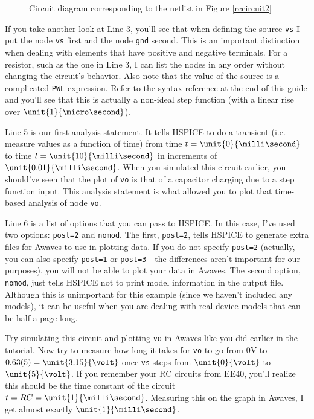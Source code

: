\documentclass{article}
\begin{document}
\begin{figure}[!htb]
  
  \centerline{\box\graph}
  \caption{Circuit diagram corresponding to the netlist in Figure \ref{rccircuit2}}
  \label{rccircuitdiagram}
\end{figure}

If you take another look at Line 3, you'll see that when defining the source \verb|vs| I put the node \verb|vs| first and the node \verb|gnd| second. This is an important distinction when dealing with elements that have positive and negative terminals. For a resistor, such as the one in Line 3, I can list the nodes in any order without changing the circuit's behavior. Also note that the value of the source is a complicated \verb|PWL| expression. Refer to the syntax reference at the end of this guide and you'll see that this is actually a non-ideal step function (with a linear rise over $\unit{1}{\micro\second}$).

Line 5 is our first analysis statement. It tells HSPICE to do a transient (i.e. measure values as a function of time) from time $t=\unit{0}{\milli\second}$ to time $t=\unit{10}{\milli\second}$ in increments of $\unit{0.01}{\milli\second}$. When you simulated this circuit earlier, you should've seen that the plot of \verb|vo| is that of a capacitor charging due to a step function input. This analysis statement is what allowed you to plot that time-based analysis of node \verb|vo|.

Line 6 is a list of options that you can pass to HSPICE. In this case, I've used two options: \verb|post=2| and \verb|nomod|. The first, \verb|post=2|, tells HSPICE to generate extra files for Awaves to use in plotting data. If you do not specify \verb|post=2| (actually, you can also specify \verb|post=1| or \verb|post=3|---the differences aren't important for our purposes), you will not be able to plot your data in Awaves. The second option, \verb|nomod|, just tells HSPICE not to print model information in the output file. Although this is unimportant for this example (since we haven't included any models), it can be useful when you are dealing with real device models that can be half a page long.

Try simulating this circuit and plotting \verb|vo| in Awaves like you did earlier in the tutorial. Now try to measure how long it takes for \verb|vo| to go from 0V to $0.63(5) = \unit{3.15}{\volt}$ once \verb|vs| steps from $\unit{0}{\volt}$ to $\unit{5}{\volt}$. If you remember your RC circuits from EE40, you'll realize this should be the time constant of the circuit $t=RC=\unit{1}{\milli\second}$. Measuring this on the graph in Awaves, I get almost exactly $\unit{1}{\milli\second}$.
\end{document}
